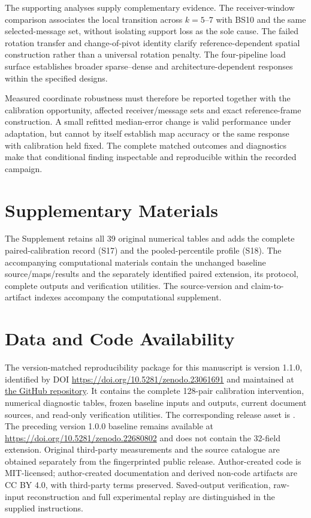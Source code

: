 \documentclass[11pt,a4paper]{article}
\begin{document}
The supporting analyses supply complementary evidence. The receiver-window comparison associates the local transition across $k=5$--7 with BS10 and the same selected-message set, without isolating support loss as the sole cause. The failed rotation transfer and change-of-pivot identity clarify reference-dependent spatial construction rather than a universal rotation penalty. The four-pipeline load surface establishes broader sparse--dense and architecture-dependent responses within the specified designs.

Measured coordinate robustness must therefore be reported together with the calibration opportunity, affected receiver/message sets and exact reference-frame construction. A small refitted median-error change is valid performance under adaptation, but cannot by itself establish map accuracy or the same response with calibration held fixed. The complete matched outcomes and diagnostics make that conditional finding inspectable and reproducible within the recorded campaign.

\section*{Supplementary Materials}
The Supplement retains all 39 original numerical tables and adds the complete paired-calibration record (S17) and the pooled-percentile profile (S18). The accompanying computational materials contain the unchanged baseline source/maps/results and the separately identified paired extension, its protocol, complete outputs and verification utilities. The source-version and claim-to-artifact indexes accompany the computational supplement.

\section*{Data and Code Availability}
The version-matched reproducibility package for this manuscript is version 1.1.0, identified by DOI \url{https://doi.org/10.5281/zenodo.23061691} \cite{baseline_archive} and maintained at \href{https://github.com/anantarj/receiver-coordinate-error-robustness-rssi-localization}{the GitHub repository}. It contains the complete 128-pair calibration intervention, numerical diagnostic tables, frozen baseline inputs and outputs, current document sources, and read-only verification utilities. The corresponding release asset is . The preceding version 1.0.0 baseline remains available at \url{https://doi.org/10.5281/zenodo.22680802} and does not contain the 32-field extension. Original third-party measurements and the source catalogue are obtained separately from the fingerprinted public release. Author-created code is MIT-licensed; author-created documentation and derived non-code artifacts are CC BY 4.0, with third-party terms preserved. Saved-output verification, raw-input reconstruction and full experimental replay are distinguished in the supplied instructions.
\end{document}
